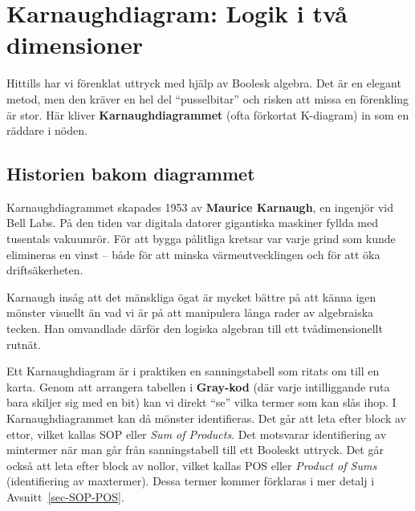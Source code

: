 \documentclass[
  swedish,
  letterpaper,
  oneside,
  openany]{book}
\begin{document}
\section{Karnaughdiagram: Logik i två
dimensioner}\label{sec-Karnaugh-diagram}

Hittills har vi förenklat uttryck med hjälp av Boolesk algebra. Det är
en elegant metod, men den kräver en hel del ``pusselbitar'' och risken
att missa en förenkling är stor. Här kliver \textbf{Karnaughdiagrammet}
(ofta förkortat K-diagram) in som en räddare i nöden.

\subsection{Historien bakom diagrammet}\label{sec-karnaugh-history}

Karnaughdiagrammet skapades 1953 av \textbf{Maurice Karnaugh}, en
ingenjör vid Bell Labs. På den tiden var digitala datorer gigantiska
maskiner fyllda med tusentals vakuumrör. För att bygga pålitliga kretsar
var varje grind som kunde elimineras en vinst -- både för att minska
värmeutvecklingen och för att öka driftsäkerheten.

Karnaugh insåg att det mänskliga ögat är mycket bättre på att känna igen
mönster visuellt än vad vi är på att manipulera långa rader av
algebraiska tecken. Han omvandlade därför den logiska algebran till ett
tvådimensionellt rutnät.

Ett Karnaughdiagram är i praktiken en sanningstabell som ritats om till
en karta. Genom att arrangera tabellen i \textbf{Gray-kod} (där varje
intilliggande ruta bara skiljer sig med en bit) kan vi direkt ``se''
vilka termer som kan slås ihop. I Karnaughdiagrammet kan då mönster
identifieras. Det går att leta efter block av ettor, vilket kallas SOP
eller \emph{Sum of Products}. Det motsvarar identifiering av mintermer
när man går från sanningstabell till ett Booleskt uttryck. Det går också
att leta efter block av nollor, vilket kallas POS eller \emph{Product of
Sums} (identifiering av maxtermer). Dessa termer kommer förklaras i mer
detalj i Avsnitt~\ref{sec-SOP-POS}.
\end{document}
